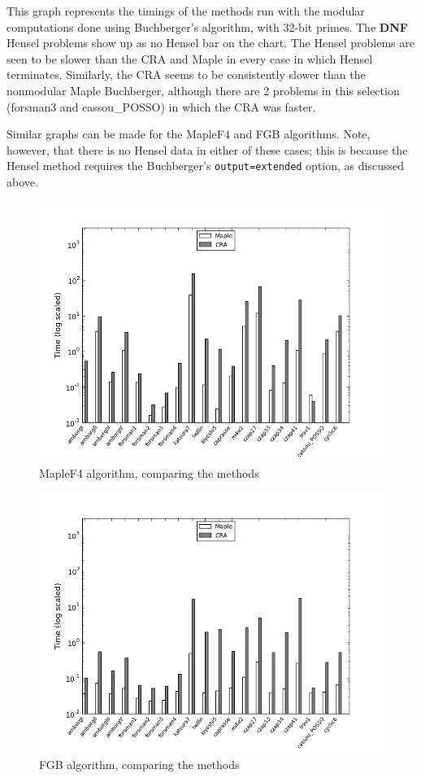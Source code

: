 \documentclass[letterpaper,12pt,titlepage,oneside,final]{book}
\begin{document}
This graph represents the timings of the methods run with the modular computations done using Buchberger's algorithm, with 32-bit primes.  The \textbf{DNF} Hensel problems show up as no Hensel bar on the chart.  The Hensel problems are seen to be slower than the CRA and Maple in every case in which Hensel terminates.  Similarly, the CRA seems to be consistently slower than the nonmodular Maple Buchberger, although there are 2 problems in this selection (forsman3 and cassou\_POSSO) in which the CRA was faster.

Similar graphs can be made for the MapleF4 and FGB algorithms.  Note, however, that there is no Hensel data in either of these cases; this is because the Hensel method requires the Buchberger's \texttt{output=extended} option, as discussed above.

\begin{figure}[H]
  \centering
  \includegraphics[scale=0.7]{f4_tests.png}
  \caption{MapleF4 algorithm, comparing the methods \label{fig:f4_tests}}
\end{figure}

\begin{figure}[H]
  \centering
  \includegraphics[scale=0.7]{fgb_tests.png}
  \caption{FGB algorithm, comparing the methods \label{fig:fgb_tests}}
\end{figure}
\end{document}
